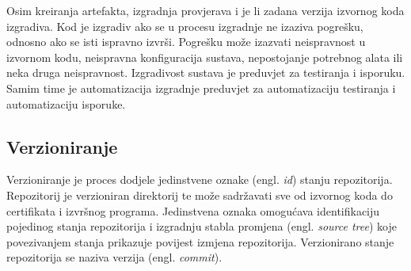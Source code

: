 \documentclass[times, utf8, diplomski, numeric]{fer}
\newcommand{\eng}[1]{(engl. \textit{#1})}
\begin{document}
Osim kreiranja artefakta, izgradnja provjerava i je li zadana verzija izvornog koda izgradiva. Kod je izgradiv ako se u procesu izgradnje ne izaziva pogrešku, odnosno ako se isti ispravno izvrši. Pogrešku može izazvati neispravnost u izvornom kodu, neispravna konfiguracija sustava, nepostojanje potrebnog alata ili neka druga neispravnost. Izgradivost sustava je preduvjet za  testiranja i isporuku. Samim time je automatizacija izgradnje preduvjet za automatizaciju testiranja i automatizaciju isporuke.

\subsection{Verzioniranje} \label{header:Verzioniranje}

Verzioniranje je proces dodjele jedinstvene oznake \eng{id} stanju repozitorija\citep{wiki:SoftwareVersioning}. Repozitorij je verzioniran direktorij te može sadržavati sve od izvornog koda do certifikata i izvršnog programa. Jedinstvena oznaka omogućava identifikaciju pojedinog stanja repozitorija i izgradnju stabla promjena \eng{source tree} koje povezivanjem stanja prikazuje povijest izmjena repozitorija. Verzionirano stanje repozitorija se naziva verzija \eng{commit}.
\end{document}
